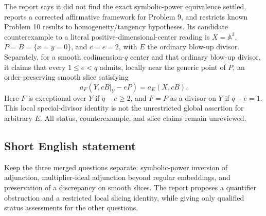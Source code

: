 \documentclass[11pt]{article}
\newcommand{\A}{\mathbb{A}}
\begin{document}
The report says it did not find the exact symbolic-power equivalence settled, reports a corrected affirmative framework for Problem 9, and restricts known Problem 10 results to homogeneity/tangency hypotheses. Its candidate counterexample to a literal positive-dimensional-center reading is $X=\A^3$, $P=B=\{x=y=0\}$, and $c=e=2$, with $E$ the ordinary blow-up divisor. Separately, for a smooth codimension-$q$ center and that ordinary blow-up divisor, it claims that every $1\leq e<q$ admits, locally near the generic point of $P$, an order-preserving smooth slice satisfying
\[
 a_F(Y,cB|_Y-eP)=a_E(X,cB).
\]
Here $F$ is exceptional over $Y$ if $q-e\geq2$, and $F=P$ as a divisor on $Y$ if $q-e=1$. This local special-divisor identity is not the unrestricted global assertion for arbitrary $E$. All status, counterexample, and slice claims remain unreviewed.
\subsection{Short English statement}
Keep the three merged questions separate: symbolic-power inversion of adjunction, multiplier-ideal adjunction beyond regular embeddings, and preservation of a discrepancy on smooth slices. The report proposes a quantifier obstruction and a restricted local slicing identity, while giving only qualified status assessments for the other questions.
\end{document}
